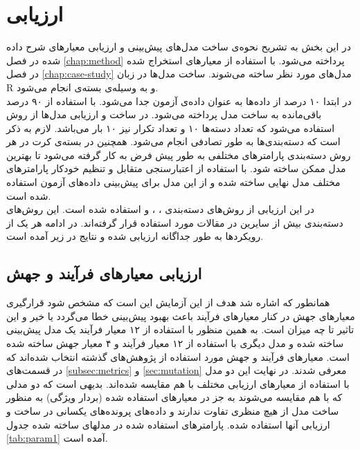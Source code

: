 \chapter{ارزیابی}
\label{chap:evaluation}
در این بخش به تشریح نحوه‌ی ساخت مدل‌های پیش‌بینی و ارزیابی معیارهای شرح داده شده در فصل \ref{chap:method} پرداخته می‌شود. با استفاده از معیارهای استخراج شده در فصل \ref{chap:case-study} مدل‌های مورد نظر ساخته می‌شوند. ساخت مدل‌ها در زبان R و به وسیله‌ی بسته‌ی  \cite{kuhn2008caret} انجام می‌شود.\\
در ابتدا ۱۰ درصد از داده‌ها به عنوان داده‌ی آزمون جدا می‌شود. با استفاده از ۹۰ درصد باقی‌مانده به ساخت مدل پرداخته می‌شود. در ساخت و ارزیابی مدل‌ها از روش  استفاده می‌شود که تعداد دسته‌ها ۱۰ و تعداد تکرار نیز ۱۰ بار می‌باشد. لازم به ذکر است که دسته‌بندی‌ها به طور تصادفی انجام می‌شود.  همچنین در بسته‌ی کرت در هر روش دسته‌بندی پارامترهای مختلفی به طور پیش فرض به کار گرفته می‌شود تا بهترین مدل ممکن ساخته شود.  با استفاده از  اعتبارسنجی متقابل و تنظیم خودکار پارامترهای مختلف مدل نهایی ساخته شده و از این مدل برای پیش‌بینی داده‌های آزمون  استفاده شده است.  \\
در این ارزیابی از  روش‌های دسته‌بندی ، ،  و  استفاده شده است. این روش‌های دسته‌بندی بیش از سایرین در مقالات مورد استفاده قرار گرفته‌اند. در ادامه هر یک از رویکردها به طور جداگانه ارزیابی شده و نتایج در زیر آمده است. 


\section{ارزیابی معیارهای فرآیند و جهش}
همانطور که اشاره شد هدف از این آزمایش این است که مشخص شود قرارگیری معیارهای جهش در کنار معیارهای فرآیند باعث بهبود پیش‌بینی خطا می‌گردد یا خیر و این تاثیر تا چه میزان است. به همین منظور  با استفاده از ۱۲ معیار فرآیند یک مدل پیش‌بینی ساخته شده و مدل دیگری  با استفاده از ۱۲ معیار فرآیند و ۴ معیار جهش ساخته شده است.  معیارهای فرآیند  و جهش مورد استفاده از پژوهش‌های گذشته انتخاب شده‌اند که در قسمت‌های \ref{subsec:metrics} و \ref{sec:mutation} معرفی شدند. 
در نهایت این دو مدل با استفاده از معیارهای ارزیابی مختلف با هم مقایسه شده‌اند. بدیهی است که دو مدلی که با هم مقایسه می‌شوند به جز در معیارهای استفاده شده (بردار ویژگی) به منظور ساخت مدل از هیچ منظری تفاوت ندارند و داده‌های  پرونده‌های یکسانی در ساخت و ارزیابی آنها استفاده شده. پارامترهای استفاده شده در مدلهای ساخته شده جدول \ref{tab:param1} آمده است.\\

